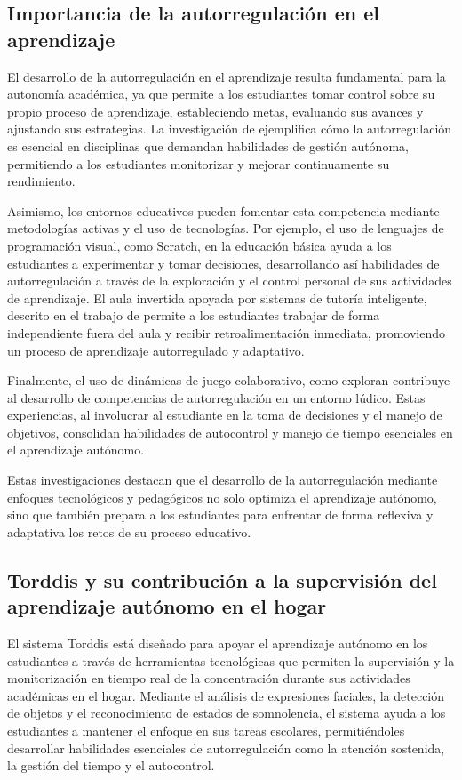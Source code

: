 \documentclass[a4paper,fleqn]{cas-sc}
\begin{document}
		\subsection{Importancia de la autorregulación en el aprendizaje}
			El desarrollo de la autorregulación en el aprendizaje resulta fundamental para la autonomía académica, ya que permite a los estudiantes tomar control sobre su propio proceso de aprendizaje, estableciendo metas, evaluando sus avances y ajustando sus estrategias. La investigación de \cite{Taber2024Developing} ejemplifica cómo la autorregulación es esencial en disciplinas que demandan habilidades de gestión autónoma, permitiendo a los estudiantes monitorizar y mejorar continuamente su rendimiento.
			
			Asimismo, los entornos educativos pueden fomentar esta competencia mediante metodologías activas y el uso de tecnologías. Por ejemplo, el uso de lenguajes de programación visual, como Scratch, en la educación básica ayuda a los estudiantes a experimentar y tomar decisiones, desarrollando así habilidades de autorregulación a través de la exploración y el control personal de sus actividades de aprendizaje. El aula invertida apoyada por sistemas de tutoría inteligente, descrito en el trabajo de \cite{Mohamed2018Implementing} permite a los estudiantes trabajar de forma independiente fuera del aula y recibir retroalimentación inmediata, promoviendo un proceso de aprendizaje autorregulado y adaptativo.
			
			Finalmente, el uso de dinámicas de juego colaborativo, como  exploran \cite{Echeverria2011AFramework} contribuye al desarrollo de competencias de autorregulación en un entorno lúdico. Estas experiencias, al involucrar al estudiante en la toma de decisiones y el manejo de objetivos, consolidan habilidades de autocontrol y manejo de tiempo esenciales en el aprendizaje autónomo.
			
			Estas investigaciones destacan que el desarrollo de la autorregulación mediante enfoques tecnológicos y pedagógicos no solo optimiza el aprendizaje autónomo, sino que también prepara a los estudiantes para enfrentar de forma reflexiva y adaptativa los retos de su proceso educativo.
			
		\subsection{Torddis y su contribución a la supervisión del aprendizaje autónomo en el hogar}		
			El sistema Torddis está diseñado para apoyar el aprendizaje autónomo en los estudiantes a través de herramientas tecnológicas que permiten la supervisión y la monitorización en tiempo real de la concentración durante sus actividades académicas en el hogar. Mediante el análisis de expresiones faciales, la detección de objetos y el reconocimiento de estados de somnolencia, el sistema ayuda a los estudiantes a mantener el enfoque en sus tareas escolares, permitiéndoles desarrollar habilidades esenciales de autorregulación como la atención sostenida, la gestión del tiempo y el autocontrol.
			
\end{document}
